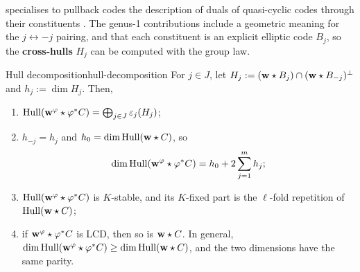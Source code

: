 \documentclass[twocolumn, 11pt]{scrartcl}
\begin{document}
 specialises to pullback codes the description of duals of quasi-cyclic codes through their constituents \cite[Prop.~4.1, Thm.~4.2]{ling2001algebraic}. The genus-1 contributions include a geometric meaning for the $j\leftrightarrow-j$ pairing, and that each constituent is an explicit elliptic code $B_j$, so the \textbf{cross-hulls} $H_j$ can be computed with the group law.

\begin{theorem}{Hull decomposition}{hull-decomposition}
    For $j\in J$, let $H_j:=(\mathbf{w}\star B_j)\cap(\mathbf{w}\star B_{-j})^\perp$ and $h_j:=\dim H_j$. Then,
    \begin{enumerate}[label={(\alph*)}, left=-4pt, topsep=2pt, itemsep=0pt]
        \item \label{enum:hd-decomp} $\operatorname{Hull}(\mathbf{w}^\varphi\star \varphi^*C)=\bigoplus_{j\in J}\varepsilon_j(H_j)$;
        \item \label{enum:hd-dim} $h_{-j}=h_j$ and $h_0=\dim\operatorname{Hull}(\mathbf{w}\star C)$, so
        \[ \dim\operatorname{Hull}(\mathbf{w}^\varphi\star \varphi^*C)=h_0+2\sum_{j=1}^{m}h_j; \]
        \item \label{enum:hd-qc} $\operatorname{Hull}(\mathbf{w}^\varphi\star \varphi^*C)$ is $K$-stable, and its $K$-fixed part is the $\ell$-fold repetition of $\operatorname{Hull}(\mathbf{w}\star C)$;
        \item \label{enum:hd-lcd} if $\mathbf{w}^\varphi\star \varphi^*C$ is LCD, then so is $\mathbf{w}\star C$. In general, $\dim\operatorname{Hull}(\mathbf{w}^\varphi\star \varphi^*C)\geq\dim\operatorname{Hull}(\mathbf{w}\star C)$, and the two dimensions have the same parity.
    \end{enumerate}
\end{theorem}
\end{document}
